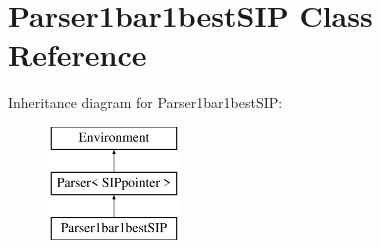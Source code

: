\hypertarget{classParser1bar1bestSIP}{}\section{Parser1bar1best\+S\+IP Class Reference}
\label{classParser1bar1bestSIP}
Inheritance diagram for Parser1bar1best\+S\+IP\+:\begin{figure}[H]
\begin{center}
\leavevmode
\includegraphics[height=3.000000cm]{classParser1bar1bestSIP}
\end{center}
\end{figure}
